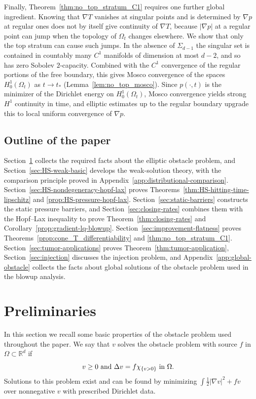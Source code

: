 \documentclass[11pt]{amsart}
\numberwithin{equation}{section}
\numberwithin{figure}{section}
\theoremstyle{plain}
\theoremstyle{definition}
\theoremstyle{remark}
\theoremstyle{plain}
\newcommand{\abs}[1]{\lvert #1 \rvert}
\def\R{\mathbb{R}}
\begin{document}
Finally, Theorem~\ref{thm:no_top_stratum_C1} requires one further global ingredient. Knowing that $\nabla T$ vanishes at singular points and
is determined by $\nabla p$ at regular ones does not by itself give continuity of
$\nabla T$, because $\abs{\nabla p}$ at a regular point can jump when the topology of
$\Omega_t$ changes elsewhere. We show that only the top stratum can cause such jumps. In the
absence of $\Sigma_{d-1}$ the singular set is contained in countably many $C^1$ manifolds of
dimension at most $d-2$, and so has zero Sobolev $2$-capacity. Combined with the $C^1$
convergence of the regular portions of the free boundary, this gives Mosco convergence of the
spaces $H^1_0(\Omega_t)$ as $t\to t_*$ (Lemma~\ref{lem:no_top_mosco}). Since $p(\cdot,t)$ is
the minimizer of the Dirichlet energy on $H^1_0(\Omega_t)$, Mosco convergence yields strong
$H^1$ continuity in time, and elliptic estimates up to the regular boundary upgrade this to
local uniform convergence of $\nabla p$.

\subsection{Outline of the paper}\label{subsec:intro-outline}

Section~\ref{sec:preliminaries} collects the required facts about the elliptic obstacle
problem, and Section~\ref{sec:HS-weak-basic} develops the weak-solution theory, with the
comparison principle proved in Appendix~\ref{app:distributional-comparison}.
Section~\ref{sec:HS-nondegeneracy-hopf-lax} proves
Theorems~\ref{thm:HS-hitting-time-lipschitz} and \ref{prop:HS-pressure-hopf-lax}.
Section~\ref{sec:static-barriers} constructs the static pressure barriers, and
Section~\ref{sec:closing-rates} combines them with the Hopf--Lax inequality to prove
Theorem~\ref{thm:closing-rates} and Corollary~\ref{prop:gradient-lq-blowup}.
Section~\ref{sec:improvement-flatness} proves
Theorems~\ref{prop:cone_T_differentiability} and \ref{thm:no_top_stratum_C1}.
Section~\ref{sec:tumor-applications} proves Theorem~\ref{thm:tumor-application},
Section~\ref{sec:injection} discusses the injection problem, and
Appendix~\ref{app:global-obstacle} collects the facts about global solutions of the obstacle
problem used in the blowup analysis.


\section{Preliminaries}\label{sec:preliminaries}
In this section we recall some basic properties of the obstacle problem used throughout the paper. We say that $v$ solves the obstacle problem with source $f$ in $\Omega\subset \R^d$ if
\begin{equation}
    v\geq 0 \hbox{ and } \Delta v = f\chi_{\{v > 0\}} \hbox{ in }\Omega.
\end{equation}
Solutions to this problem exist and can be found by minimizing $\int\frac12|\nabla v|^2 + fv$ over nonnegative $v$ with prescribed Dirichlet data.
\end{document}
